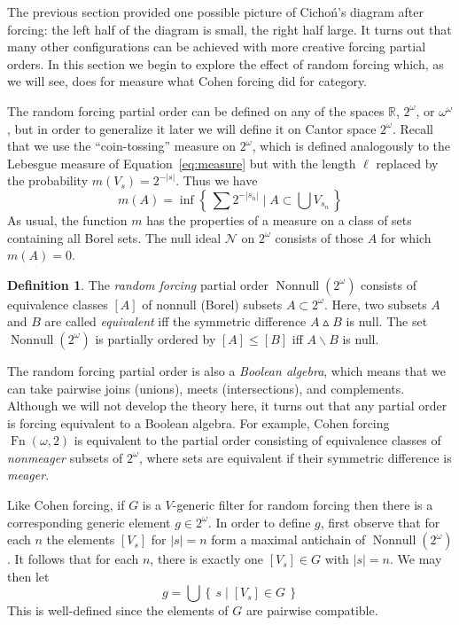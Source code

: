 \documentclass[11pt,oneside]{amsbook}
\newcommand{\set}[1]{\left\{\,#1\,\right\}}
\newcommand{\R}{\mathbb R}
\newcommand{\Null}{\mathcal N}
\DeclareMathOperator{\Fn}{Fn}
\DeclareMathOperator{\Nonnull}{Nonnull}
\theoremstyle{definition}
\theoremstyle{plain}
\theoremstyle{definition}
\newtheorem{definition}[theorem]{Definition}
\theoremstyle{remark}
\numberwithin{equation}{section}
\numberwithin{figure}{section}
\begin{document}
The previous section provided one possible picture of Cicho\'n's diagram after forcing: the left half of the diagram is small, the right half large. It turns out that many other configurations can be achieved with more creative forcing partial orders. In this section we begin to explore the effect of random forcing which, as we will see, does for measure what Cohen forcing did for category.

The random forcing partial order can be defined on any of the spaces $\R$, $2^\omega$, or $\omega^\omega$, but in order to generalize it later we will define it on Cantor space $2^\omega$. Recall that we use the ``coin-tossing'' measure on $2^\omega$, which is defined analogously to the Lebesgue measure of Equation~\eqref{eq:measure} but with the length $\ell$ replaced by the probability $m(V_s)=2^{-|s|}$. Thus we have
\[m(A)=\inf\set{\sum2^{-|s_n|}\mid A\subset\bigcup V_{s_n}}
\]
As usual, the function $m$ has the properties of a measure on a class of sets containing all Borel sets. The null ideal $\Null$ on $2^\omega$ consists of those $A$ for which $m(A)=0$.

\begin{definition}
  The \emph{random forcing} partial order $\Nonnull(2^\omega)$ consists of equivalence classes $[A]$ of nonnull (Borel) subsets $A\subset2^\omega$. Here, two subsets $A$ and $B$ are called \emph{equivalent} iff the symmetric difference $A\mathbin{\vartriangle} B$ is null. The set $\Nonnull(2^\omega)$ is partially ordered by $[A]\leq[B]$ iff $A\smallsetminus B$ is null.
\end{definition}

The random forcing partial order is also a \emph{Boolean algebra}, which means that we can take pairwise joins (unions), meets (intersections), and complements. Although we will not develop the theory here, it turns out that any partial order is forcing equivalent to a Boolean algebra. For example, Cohen forcing $\Fn(\omega,2)$ is equivalent to the partial order consisting of equivalence classes of \emph{nonmeager} subsets of $2^\omega$, where sets are equivalent if their symmetric difference is \emph{meager}.

Like Cohen forcing, if $G$ is a $V$-generic filter for random forcing then there is a corresponding generic element $g\in2^\omega$. In order to define $g$, first observe that for each $n$ the elements $[V_s]$ for $|s|=n$ form a maximal antichain of $\Nonnull(2^\omega)$. It follows that for each $n$, there is exactly one $[V_s]\in G$ with $|s|=n$. We may then let
\[g=\bigcup\set{s\mid [V_s]\in G}
\]
This is well-defined since the elements of $G$ are pairwise compatible.
\end{document}
